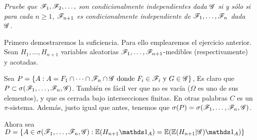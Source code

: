 \emph{
	Pruebe que $\mathscr{F}_1,\mathscr{F}_2,\ldots, $ son condicionalmente independientes dada 
	$\mathscr{G}$ si y s\'olo si para cada $n\geq 1$, $\mathscr{F}_{n+1}$ es condicionalmente 
	independiente de $\mathscr{F}_1,\ldots, \mathscr{F}_n$ dada $\mathscr{G}$. 
}

\afterstatement\par\null

Primero demostraremos la suficiencia. Para ello emplearemos el ejercicio anterior.
Sean $H_1, \dots, H_{n+1}$ variables aleatorias $\mathscr{F}_1, \dots, \mathscr{F}_{n+1}$-medibles (respectivamente) 
y acotadas.\par\null

Sea $P = \{ A : A = F_1 \cap \dots \cap \mathscr{F}_n \cap \mathscr{G} \text{ donde } F_i \in \mathscr{F}_i \text{ y } G \in \mathscr{G} \}$,
Es claro que $P \subset \sigma(\mathscr{F}_1, \dots, \mathscr{F}_n, \mathscr{G})$. También es fácil ver que no es vacía ($\Omega$ es uno de sus elementos), 
y que es cerrada bajo intersecciones finitas. En otras palabras $C$ es un $\pi$-sistema. Además, justo
igual que antes, tenemos que $\sigma(P) = \sigma(\mathscr{F}_1, \dots, \mathscr{F}_n, \mathscr{G})$.\par\null

Ahora sea $D = \{ A \in \sigma(\F_1, \dots, \F_n, \G) : \E(H_{n+1} \indic_A) = \E(\E(H_{n+1} | \G) \indic_A) \}$



